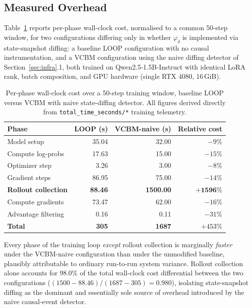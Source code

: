\documentclass[11pt]{article}
\begin{document}
\subsection{Measured Overhead}

Table~\ref{tab:phase-timing} reports per-phase wall-clock cost, normalised to
a common 50-step window, for two configurations differing only in whether
$\varphi_\delta$ is implemented via state-snapshot diffing: a baseline LOOP
configuration with no causal instrumentation, and a VCBM configuration using
the naive diffing detector of Section~\ref{sec:infra}.1, both trained on
Qwen2.5-1.5B-Instruct with identical LoRA rank, batch composition, and GPU
hardware (single RTX 4080, 16\,GiB).

\begin{table}[h]
\centering
\caption{Per-phase wall-clock cost over a 50-step training window, baseline
LOOP versus VCBM with naive state-diffing detector. All figures derived
directly from \texttt{total\_time\_seconds/*} training telemetry.}
\label{tab:phase-timing}
\begin{tabular}{@{}lrrr@{}}
\toprule
Phase & LOOP (s) & VCBM-naive (s) & Relative cost \\
\midrule
Model setup & 35.04 & 32.00 & $-9\%$ \\
Compute log-probs & 17.63 & 15.00 & $-15\%$ \\
Optimizer step & 3.26 & 3.00 & $-8\%$ \\
Gradient steps & 86.95 & 75.00 & $-14\%$ \\
\textbf{Rollout collection} & \textbf{88.46} & \textbf{1500.00} & $\mathbf{+1596\%}$ \\
Compute gradients & 73.47 & 62.00 & $-16\%$ \\
Advantage filtering & 0.16 & 0.11 & $-31\%$ \\
\midrule
\textbf{Total} & \textbf{305} & \textbf{1687} & $+453\%$ \\
\bottomrule
\end{tabular}
\end{table}

Every phase of the training loop \emph{except} rollout collection is
marginally \emph{faster} under the VCBM-naive configuration than under the
unmodified baseline, plausibly attributable to ordinary run-to-run system
variance. Rollout collection alone accounts for 98.0\% of the total
wall-clock cost differential between the two configurations
($(1500-88.46)/(1687-305) = 0.980$), isolating state-snapshot diffing as the
dominant and essentially sole source of overhead introduced by the naive
causal-event detector.
\end{document}
